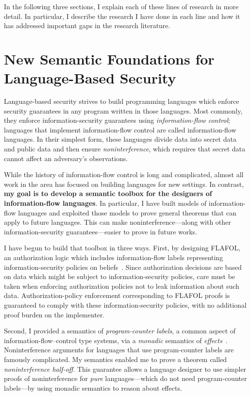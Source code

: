 \documentclass{article}
\theoremstyle{definition}
\begin{document}
In the following three sections, I explain each of these lines of research in more detail.
In particular, I describe the research I have done in each line and how it has addressed important gaps in the research literature.

\section*{New Semantic Foundations for Language-Based Security}

Language-based security strives to build programming languages which enforce security guarantees in any program written in those languages.
Most commonly, they enforce information-security guarantees using \emph{information-flow control}; languages that implement information-flow control are called information-flow languages.
In their simplest form, these languages divide data into secret data and public data and then ensure \emph{noninterference}, which requires that secret data cannot affect an adversary's observations.

While the history of information-flow control is long and complicated, almost all work in the area has focused on building languages for new settings.
In contrast, \textbf{my goal is to develop a semantic toolbox for the designers of information-flow languages}.
In particular, I have built models of information-flow languages and exploited those models to prove general theorems that can apply to future languages.
This can make noninterference---along with other information-security guarantees---easier to prove in future works.

I have begun to build that toolbox in three ways.
First, by designing FLAFOL, an authorization logic which includes information-flow labels representing information-security policies on beliefs~\citep{HirschACAT20}.
Since authorization decisions are based on data which might be subject to information-security policies, care must be taken when enforcing authorization policies not to leak information about such data.
Authorization-policy enforcement corresponding to FLAFOL proofs is guaranteed to comply with these information-security policies, with no additional proof burden on the implementer.

Second, I provided a semantics of \emph{program-counter labels}, a common aspect of information-flow--control type systems, via a \emph{monadic} semantics of \emph{effects}~\citep{HirschC21}.
Noninterference arguments for languages that use program-counter labels are famously complicated.
My semantics enabled me to prove a theorem called \emph{noninterference half-off}.
This guarantee allows a language designer to use simpler proofs of noninterference for \emph{pure} languages---which do not need program-counter labels---by using monadic semantics to reason about effects.
\end{document}

